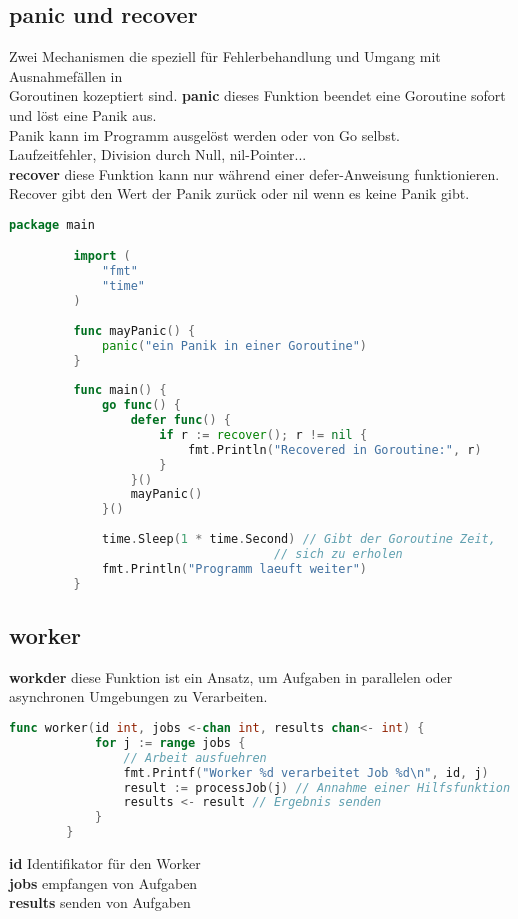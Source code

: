 \documentclass[twoside,a4paper,12pt]{article}
\begin{document}
\subsection{panic und recover}
Zwei Mechanismen die speziell für Fehlerbehandlung und Umgang mit Ausnahmefällen in \\ 
Goroutinen kozeptiert sind. 
\textbf{panic} dieses Funktion beendet eine Goroutine sofort und löst eine Panik aus. \\ 
Panik kann im Programm ausgelöst werden oder von Go selbst. \\ 
Laufzeitfehler, Division durch Null, nil-Pointer... \\ 
\textbf{recover} diese Funktion kann nur während einer defer-Anweisung funktionieren. \\ 
Recover gibt den Wert der Panik zurück oder nil wenn es keine Panik gibt.
\begin{center} 
  \begin{minipage}{1.0\textwidth}
    \begin{lstlisting}[language=Go]
     package main

		 import (
		     "fmt"
		     "time"
		 )
		 
		 func mayPanic() {
		     panic("ein Panik in einer Goroutine")
		 }
		 
		 func main() {
		     go func() {
		         defer func() {
		             if r := recover(); r != nil {
		                 fmt.Println("Recovered in Goroutine:", r)
		             }
		         }()
		         mayPanic()
		     }()
		 
		     time.Sleep(1 * time.Second) // Gibt der Goroutine Zeit, 
                                     // sich zu erholen
		     fmt.Println("Programm laeuft weiter")
		 } 
    \end{lstlisting}
  \end{minipage}
\end{center}

\subsection{worker}
\textbf{workder} diese Funktion ist ein Ansatz, um Aufgaben in parallelen oder \\
asynchronen Umgebungen zu Verarbeiten. \\
\begin{center}
  \begin{minipage}{1.0\textwidth}
    \begin{lstlisting}[language=Go]
		func worker(id int, jobs <-chan int, results chan<- int) {
		    for j := range jobs {
		        // Arbeit ausfuehren
		        fmt.Printf("Worker %d verarbeitet Job %d\n", id, j)
		        result := processJob(j) // Annahme einer Hilfsfunktion
		        results <- result // Ergebnis senden
		    }
		}
    \end{lstlisting}
  \end{minipage}
\end{center}
\textbf{id} Identifikator für den Worker \\ 
\textbf{jobs} empfangen von Aufgaben \\ 
\textbf{results} senden von Aufgaben \\ 
\end{document}
